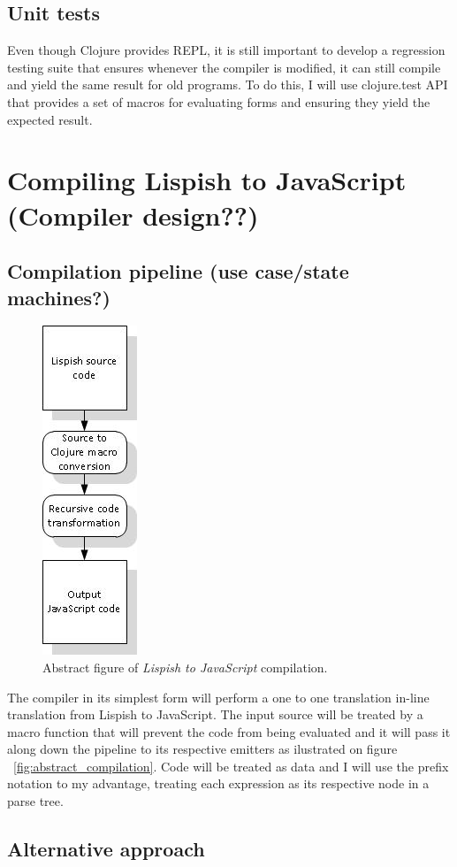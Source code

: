 \subsection{Unit tests}
Even though Clojure provides REPL, it is still important to develop a regression testing suite that ensures whenever the compiler is modified, it can still compile and yield the same result for old programs.
To do this, I will use clojure.test API that provides a set of macros for evaluating forms and ensuring they yield the expected result. 

\section{Compiling Lispish to JavaScript (Compiler design??)}

\subsection{Compilation pipeline (use case/state machines?)}

\begin{figure}[hb]
	\centering
	\includegraphics{Graphics/test.jpg}
	\caption[Abstract \textit{Lispish to JavaScript} compilation.]
   {Abstract figure of \textit{Lispish to JavaScript} compilation.}
\end{figure}

The compiler in its simplest form will perform a one to one translation in-line translation from Lispish to JavaScript. 
The input source will be treated by a macro function that will prevent the code from being evaluated and it will pass it along down the pipeline to its respective emitters as ilustrated on figure ~\ref{fig:abstract_compilation}. Code will be treated as data and I will use the prefix notation to my advantage, treating each expression as its respective node in a parse tree. 

\subsection{Alternative approach}
